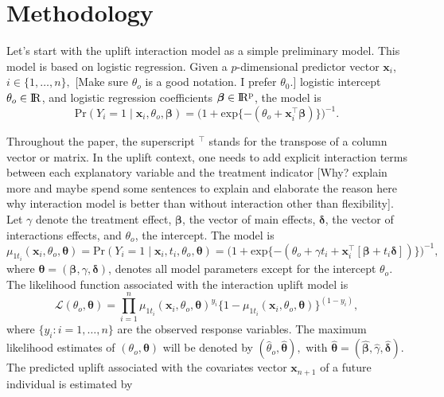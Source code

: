 \documentclass{article}
\def\x{\mathbf x}
\def\bbeta{\boldsymbol \beta}
\def \real{\rm I\!R}
\def \vahid {\color{magenta}}
\begin{document}
\section{Methodology}

Let's start with the uplift interaction model \citep{lo2002true} as a simple preliminary model. This model is based on logistic regression. Given a $p$-dimensional predictor vector $\textbf{x}_i$, $i \in \{1,\ldots,n\},$ {\vahid [Make sure $\theta_o$ is a good notation. I prefer $\theta_0$.]} logistic intercept $\theta_o \in \real$, and logistic regression coefficients $\bbeta \in \real^p$, 
the model is
\begin{equation*} 
     \mathrm{Pr}(Y_i=1 \mid \textbf{x}_i, \theta_o, \bbeta) = \bigl(1 + \mathrm{exp}\{- (\theta_o + \textbf{x}_i^{\top} \bbeta) \} \bigr)^{-1}.
\end{equation*}

Throughout the paper, the superscript $^\top$ stands for the transpose of a column vector or matrix. In the uplift context, one needs to add explicit interaction terms between each explanatory variable and the treatment indicator {\vahid [Why? explain more and maybe spend some sentences to explain and elaborate the reason here why interaction model is better than without interaction other than flexibility]}. Let $\gamma$ denote the treatment effect, $\boldsymbol{\beta}$, the vector of main effects, $\boldsymbol{\delta}$, the vector of interactions effects, and $\theta_o$, the intercept. 
The model is 
\begin{equation}
  \mu_{1t_i}(\x_i, \theta_o, \boldsymbol{\theta}) = \mathrm{Pr} (Y_i = 1 \mid \mathbf{x}_i, t_i, \theta_o, \boldsymbol{\theta}) =
  \bigl( 1+ \mathrm{exp}\{-(\theta_o + \gamma t_i + \mathbf{x}_i^\top [\boldsymbol{\beta} + t_i \boldsymbol{\delta}] ) \} \bigr)^{-1},
\label{eq:pitheta}
\end{equation}
where $\boldsymbol{\theta} = (\boldsymbol{\beta}, \gamma, \boldsymbol{\delta})$, denotes all model parameters except for the intercept $\theta_o$. The likelihood function associated with the interaction uplift model is 
\begin{equation}
    \mathcal{L}(\theta_o, \boldsymbol{\theta}) =  \prod_{i=1}^{n} \mu_{1t_i}(\x_i, \theta_o, \boldsymbol{\theta})^{y_i} \{1-\mu_{1t_i}(\x_i, \theta_o, \boldsymbol{\theta})\}^{(1-y_i)},
    \label{eq:uplift_likelihood}
\end{equation}
where $\{y_i : i=1,\ldots,n\}$ are the observed response variables.
The maximum likelihood estimates of  $(\theta_o, \boldsymbol{\theta})$ will be denoted by $(\hat{\theta}_o, \hat{\boldsymbol{\theta}}),$
with $\hat{\boldsymbol{\theta}} = (\boldsymbol{\hat{\beta}}, \hat{\gamma}, \boldsymbol{\hat{\delta}})$.
%
The predicted uplift associated with the covariates vector $\mathbf{x}_{n+1}$ of a future individual is estimated by
\end{document}
